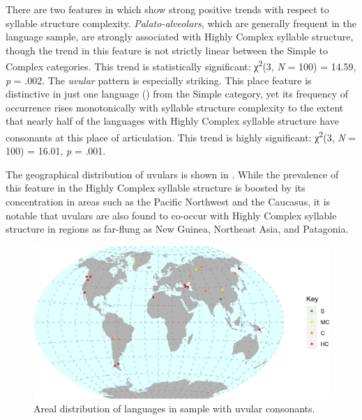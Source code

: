   There are two features in  which show strong positive trends with respect to syllable structure complexity. \textit{Palato-alveolars}, which are generally frequent in the language sample, are strongly associated with Highly Complex syllable structure, though the trend in this feature is not strictly linear between the Simple to Complex categories. This trend is statistically significant: χ\textsuperscript{2}(3, \textit{N} = 100) = 14.59, \textit{p} = .002. The \textit{uvular} pattern is especially striking. This place feature is distinctive in just one language () from the Simple category, yet its frequency of occurrence rises monotonically with syllable structure complexity to the extent that nearly half of the languages with Highly Complex syllable structure have consonants at this place of articulation. This trend is highly significant: χ\textsuperscript{2}(3, \textit{N} = 100) = 16.01, \textit{p} = .001. 

  The geographical distribution of uvulars is shown in . While the prevalence of this feature in the Highly Complex syllable structure is boosted by its concentration in areas such as the Pacific Northwest and the Caucasus, it is notable that uvulars are also found to co-occur with Highly Complex syllable structure in regions as far-flung as New Guinea, Northeast Asia, and Patagonia.

\begin{figure}
\includegraphics[width=\textwidth]{figures/fig49.png}
\caption{\label{fig:4.9}Areal distribution of languages in sample with uvular consonants.}
\end{figure}

